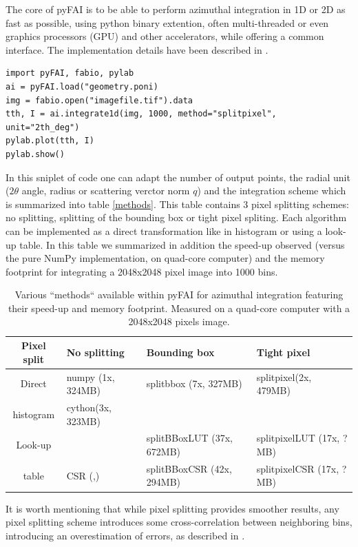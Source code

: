 \documentclass[preprint]{iucr}
\begin{document}
The core of pyFAI is to be able to perform azimuthal integration in 1D or 2D as
fast as possible, using python binary extention, often multi-threaded or even
graphics processors (GPU) and other accelerators, while offering a common
interface. 
The implementation details have been described in
\cite{kieffer_ashiotis-proc-euroscipy-2014}.

\begin{verbatim}
import pyFAI, fabio, pylab
ai = pyFAI.load("geometry.poni)
img = fabio.open("imagefile.tif").data
tth, I = ai.integrate1d(img, 1000, method="splitpixel", unit="2th_deg")
pylab.plot(tth, I)
pylab.show()
\end{verbatim}
In this sniplet of code one can adapt the number of output points, 
the radial unit ($2\theta$ angle, radius or scattering verctor norm $q$) and the
integration scheme which is summarized into table \ref{methods}.
This table contains 3 pixel splitting schemes: no splitting, splitting of the
bounding box or tight pixel spliting. Each algorithm can be implemented as a
direct transformation like in histogram or using a look-up table.
In this table we summarized in addition the speed-up observed (versus the pure
NumPy \cite{numpy} implementation, on  quad-core computer) and the memory
footprint for integrating a 2048x2048 pixel image into 1000 bins.

\begin{table}
\caption{Various ``methods`` available within pyFAI for azimuthal integration
featuring their speed-up and memory footprint. Measured on a quad-core
computer with a 2048x2048 pixels image.}
\begin{tabular}[pos]{|c|l|l|l|}
\hline
Pixel split& No splitting & Bounding box & Tight pixel \\
\hline
Direct    & numpy (1x, 324MB) & splitbbox (7x, 327MB) & splitpixel(2x, 479MB)\\
histogram & cython(3x, 323MB) &                       &                \\
\hline
Look-up   &       & splitBBoxLUT (37x, 672MB)&splitpixelLUT (17x, ?MB)\\
table     & CSR (,)       & splitBBoxCSR (42x, 294MB)&splitpixelCSR (17x, ?MB)\\
\hline
\end{tabular}
\label{table:methods}
\end{table}

It is worth mentioning that while pixel splitting provides smoother results, any
pixel splitting scheme introduces some cross-correlation between neighboring
bins, introducing an overestimation of errors, as described in \cite{billinge2014}.
\end{document}
